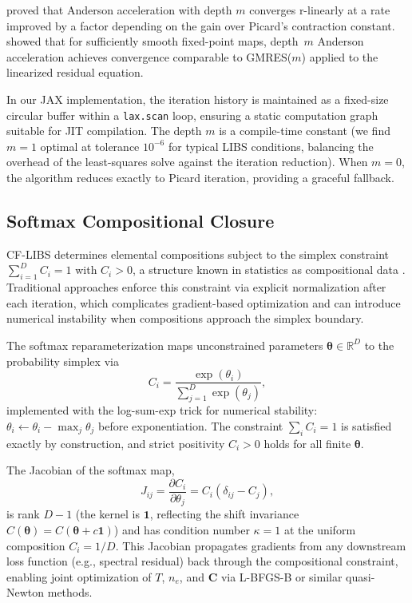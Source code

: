 \documentclass[preprint,12pt,authoryear]{elsarticle}
\begin{document}
\citet{Toth2015} proved that Anderson acceleration with depth $m$ converges r-linearly at a rate improved by a factor depending on the gain over Picard's contraction constant.
\citet{Evans2018} showed that for sufficiently smooth fixed-point maps, depth~$m$ Anderson acceleration achieves convergence comparable to GMRES($m$) applied to the linearized residual equation.

In our JAX implementation, the iteration history is maintained as a fixed-size circular buffer within a \texttt{lax.scan} loop, ensuring a static computation graph suitable for JIT compilation.
The depth $m$ is a compile-time constant (we find $m = 1$ optimal at tolerance $10^{-6}$ for typical LIBS conditions, balancing the overhead of the least-squares solve against the iteration reduction).
When $m = 0$, the algorithm reduces exactly to Picard iteration, providing a graceful fallback.

\subsection{Softmax Compositional Closure}
\label{sec:softmax}

CF-LIBS determines elemental compositions subject to the simplex constraint $\sum_{i=1}^D C_i = 1$ with $C_i > 0$, a structure known in statistics as compositional data \citep{Egozcue2003}.
Traditional approaches enforce this constraint via explicit normalization after each iteration, which complicates gradient-based optimization and can introduce numerical instability when compositions approach the simplex boundary.

The softmax reparameterization maps unconstrained parameters $\bm{\theta} \in \mathbb{R}^D$ to the probability simplex via
\begin{equation}
  C_i = \frac{\exp(\theta_i)}{\sum_{j=1}^D \exp(\theta_j)},
  \label{eq:softmax}
\end{equation}
implemented with the log-sum-exp trick for numerical stability: $\theta_i \leftarrow \theta_i - \max_j \theta_j$ before exponentiation.
The constraint $\sum_i C_i = 1$ is satisfied exactly by construction, and strict positivity $C_i > 0$ holds for all finite $\bm{\theta}$.

The Jacobian of the softmax map,
\begin{equation}
  J_{ij} = \frac{\partial C_i}{\partial \theta_j} = C_i(\delta_{ij} - C_j),
  \label{eq:softmax-jacobian}
\end{equation}
is rank $D - 1$ (the kernel is $\bm{1}$, reflecting the shift invariance $C(\bm{\theta}) = C(\bm{\theta} + c\bm{1})$) and has condition number $\kappa = 1$ at the uniform composition $C_i = 1/D$.
This Jacobian propagates gradients from any downstream loss function (e.g., spectral residual) back through the compositional constraint, enabling joint optimization of $T$, $n_e$, and $\bm{C}$ via L-BFGS-B or similar quasi-Newton methods.
\end{document}

